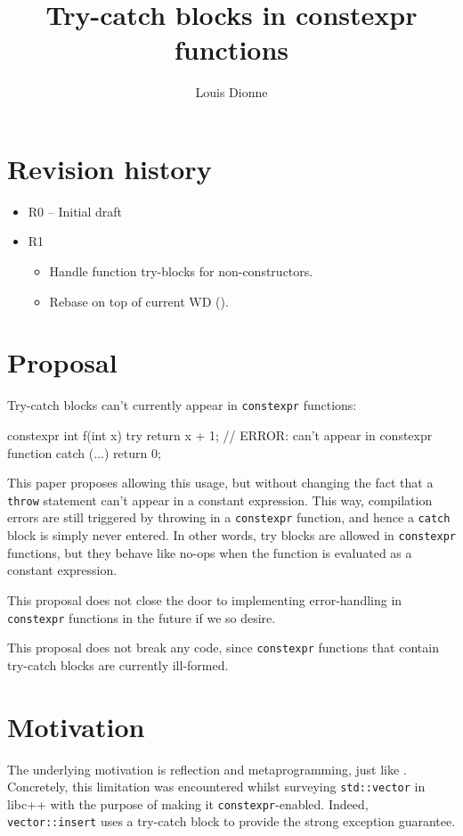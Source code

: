 \documentclass{wg21}
\title{Try-catch blocks in constexpr functions}
\author{Louis Dionne}{ldionne@apple.com}
\newcommand{\cc}[1]{\texttt{#1}}
\begin{document}
\maketitle

\section{Revision history}
\begin{itemize}
  \item R0 -- Initial draft
  \item R1 \begin{itemize}
              \item Handle function try-blocks for non-constructors.
              \item Rebase on top of current WD (\cite{N4778}).
              \end{itemize}
\end{itemize}


\section{Proposal}
Try-catch blocks can't currently appear in \cc{constexpr} functions:

\begin{cpp}
  constexpr int f(int x) {
    try { return x + 1; } // ERROR: can't appear in constexpr function
    catch (...) { return 0; }
  }
\end{cpp}

This paper proposes allowing this usage, but without changing the fact that
a \cc{throw} statement can't appear in a constant expression. This way,
compilation errors are still triggered by throwing in a \cc{constexpr}
function, and hence a \cc{catch} block is simply never entered. In other
words, try blocks are allowed in \cc{constexpr} functions, but they behave
like no-ops when the function is evaluated as a constant expression.

This proposal does not close the door to implementing error-handling in
\cc{constexpr} functions in the future if we so desire.

This proposal does not break any code, since \cc{constexpr} functions that
contain try-catch blocks are currently ill-formed.


\section{Motivation}
The underlying motivation is reflection and metaprogramming, just like
\cite{P0784R1}. Concretely, this limitation was encountered whilst surveying
\cc{std::vector} in libc++ with the purpose of making it \cc{constexpr}-enabled.
Indeed, \cc{vector::insert} uses a try-catch block to provide the strong
exception guarantee.
\end{document}
